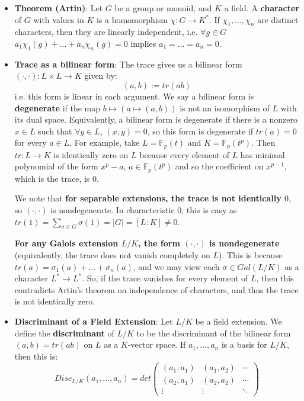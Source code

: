 \documentclass[11pt, oneside]{amsart}   	%
\theoremstyle{definition}
\begin{document}
\begin{itemize}
	\item \textbf{Theorem (Artin)}: Let $G$ be a group or monoid, and $K$ a field. A \textbf{character} of $G$ with values in $K$ is a homomorphism $\chi : 
	G\rightarrow K^*$. If $\chi_1, ..., \chi_n$ are distinct characters, then they are linearly independent, i.e. $\forall g\in G$ $a_1\chi_1(g) + ... + a_n
	\chi_n(g) = 0$ implies $a_1 = ... = a_n = 0$. 
	
	\item \textbf{Trace as a bilinear form}: The trace gives us a bilinear form $(\cdot, \cdot): L\times L\rightarrow K$ given by:
	$$
		(a, b) := tr(ab)
	$$
	i.e. this form is linear in each argument. We say a bilinear form is \textbf{degenerate} if the map $b\mapsto (a\mapsto (a, b))$ is not an isomorphism of 
	$L$ with its dual space. Equivalently, a bilinear form is degenerate if there is a nonzero $x\in L$ such that $\forall y\in L$, $(x, y) = 0$, so this form is 
	degenerate if $tr(a) = 0$ for every $a\in L$. For example, take $L = \mathbb F_p(t)$ and $K = \mathbb F_p(t^p)$. Then $tr : L\rightarrow K$ is 
	identically zero on $L$ because every element of $L$ has minimal polynomial of the form $x^p - a$, $a\in\mathbb F_p(t^p)$ and so the coefficient on 
	$x^{p - 1}$, which is the trace, is 0. 
	
	We note that \textbf{for separable extensions, the trace is not identically $0$}, so $(\cdot, \cdot)$ is nondegenerate. In characteristic $0$, this is easy 
	as $tr(1) = \sum_{\sigma\in G}\sigma(1) = |G| = [L : K]\neq 0$. 
	
	\textbf{For any Galois extension $L / K$, the form $(\cdot, \cdot)$ is nondegenerate} (equivalently, the trace does not vanish completely on $L$). This is 
	because $tr(a) = \sigma_1(a) + ... + \sigma_n(a)$, and we may view each $\sigma\in Gal(L / K)$ as a character $L^*\rightarrow L^*$. So, if the trace 
	vanishes for every element of $L$, then this contradicts Artin's theorem on independence of characters, and thus the trace is not identically zero.

	\item \textbf{Discriminant of a Field Extension}: Let $L / K$ be a field extension. We define the \textbf{discriminant} of $L / K$ to be the discriminant of 
	the bilinear form $(a, b) = tr(ab)$ on $L$ as a $K$-vector space. If $a_1, ..., a_n$ is a basis for $L / K$, then this is:
	$$
		Disc_{L / K}(a_1, ..., a_n) = det
		\begin{pmatrix}
			(a_1, a_1) & (a_1, a_2) & \cdots \\
			(a_2, a_1) & (a_2, a_2) & \cdots \\
			\vdots & \vdots & \ddots
		\end{pmatrix}
	$$
	

\end{itemize}
\end{document}
